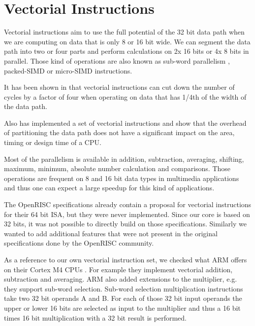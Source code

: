 \section{Vectorial Instructions}

Vectorial instructions aim to use the full potential of the 32 bit data path
when we are computing on data that is only 8 or 16 bit wide. We can segment the
data path into two or four parts and perform calculations on 2x 16 bits or 4x 8
bits in parallel. Those kind of operations are also known as sub-word parallelism
\cite{MAX2, PLX}, packed-SIMD \cite{RISCV} or micro-SIMD \cite{MCOMP} instructions.

It has been shown in \cite{PLX} that vectorial instructions can cut down the number
of cycles by a factor of four when operating on data that has 1/4th of
the width of the data path. 

Also \cite{MAX2} has implemented a set of vectorial instructions and show that
the overhead of partitioning the data path does not have a significant impact
on the area, timing or design time of a \gls{CPU}.


Most of the parallelism is available in addition, subtraction, averaging,
shifting, maximum, minimum, absolute number calculation and comparisons. Those
operations are frequent on 8 and 16 bit data types in multimedia applications
\cite{MCOMP} and thus one can expect a large speedup for this kind of
applications.

The OpenRISC specifications \cite{OR1KSPEC} already contain a proposal for
vectorial instructions for their 64 bit \gls{ISA}, but they were never
implemented. Since our core is based on 32 bits, it was not possible to directly
build on those specifications. Similarly we wanted to add additional features
that were not present in the original specifications done by the OpenRISC
community.

As a reference to our own vectorial instruction set, we checked what ARM offers
on their Cortex M4 \glspl{CPU} \cite{CM4UG}. For example they implement
vectorial addition, subtraction and averaging.
ARM also added extensions to the multiplier, e.g. they support sub-word
selection.
Sub-word selection multiplication instructions take two 32 bit operands A and
B.  For each of those 32 bit input operands the upper or lower 16 bits are
selected as input to the multiplier and thus a 16 bit times 16 bit
multiplication with a 32 bit result is performed.


